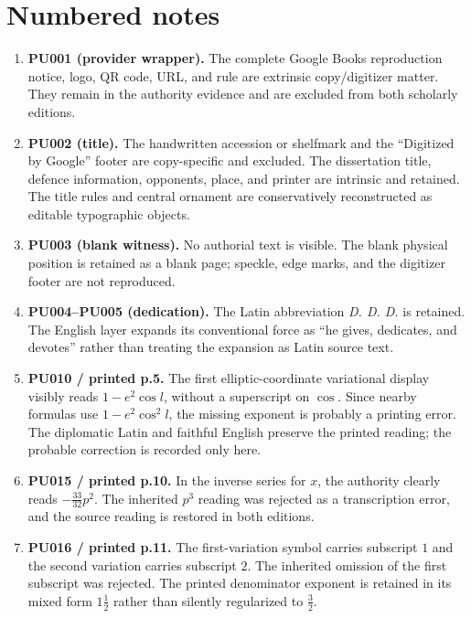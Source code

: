 \documentclass[10pt]{article}
\begin{document}
\section*{Numbered notes}
\begin{enumerate}
\item[1.] \textbf{PU001 (provider wrapper).} The complete Google Books reproduction notice, logo, QR code, URL, and rule are extrinsic copy/digitizer matter. They remain in the authority evidence and are excluded from both scholarly editions.

\item[2.] \textbf{PU002 (title).} The handwritten accession or shelfmark and the ``Digitized by Google'' footer are copy-specific and excluded. The dissertation title, defence information, opponents, place, and printer are intrinsic and retained. The title rules and central ornament are conservatively reconstructed as editable typographic objects.

\item[3.] \textbf{PU003 (blank witness).} No authorial text is visible. The blank physical position is retained as a blank page; speckle, edge marks, and the digitizer footer are not reproduced.

\item[4.] \textbf{PU004--PU005 (dedication).} The Latin abbreviation \emph{D. D. D.} is retained. The English layer expands its conventional force as ``he gives, dedicates, and devotes'' rather than treating the expansion as Latin source text.

\item[5.] \textbf{PU010 / printed p.5.} The first elliptic-coordinate variational display visibly reads $1-e^2\cos l$, without a superscript on $\cos$. Since nearby formulas use $1-e^2\cos^2 l$, the missing exponent is probably a printing error. The diplomatic Latin and faithful English preserve the printed reading; the probable correction is recorded only here.

\item[6.] \textbf{PU015 / printed p.10.} In the inverse series for $x$, the authority clearly reads $-\frac{33}{32}p^2$. The inherited $p^3$ reading was rejected as a transcription error, and the source reading is restored in both editions.

\item[7.] \textbf{PU016 / printed p.11.} The first-variation symbol carries subscript $1$ and the second variation carries subscript $2$. The inherited omission of the first subscript was rejected. The printed denominator exponent is retained in its mixed form $1\frac12$ rather than silently regularized to $\frac32$.


\end{enumerate}
\end{document}
